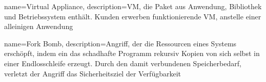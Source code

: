 {%
  name={Virtual Appliance},
  description={VM, die Paket aus Anwendung, Bibliothek und Betriebssystem enthält. Kunden erwerben funktionierende VM, anstelle einer alleinigen Anwendung \cite[S.672f.]{tanenbaumOS}}
}

{%
  name={Fork Bomb},
  description={Angriff, der die Ressourcen eines Systems erschöpft, indem ein das schadhafte Programm rekursiv Kopien von sich selbst in einer Endlosschleife erzeugt. Durch den damit verbundenen Speicherbedarf, verletzt der Angriff das Sicherheitsziel der Verfügbarkeit}
}
